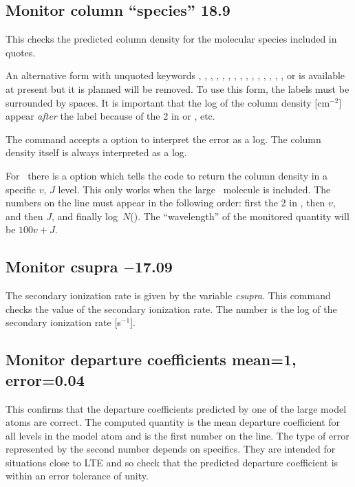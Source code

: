 \subsection{Monitor column ``species'' 18.9}

This checks the predicted column density for the molecular species
included in quotes.

An alternative form with unquoted keywords ,
, , , ,
, , , ,
, , , ,
, , or  is available at
present but it is planned will be removed.  To use this form, the
labels must be surrounded by spaces.  It is important that the log of
the column density [cm$^{-2}$] appear \emph{after} the label because
of the 2 in  or , etc.

The command accepts a  option to interpret
the error as a log.
The column density itself is always interpreted as a log.

For \htwo\ there is a  option which tells the code
to return the column density in a specific $v$, $J$ level.
This only works when the large \htwo\ molecule
is included.
The numbers on the line must appear in the following order:
first the 2 in , then $v$,
and then $J$, and finally log~$N$(\htwo).
The ``wavelength'' of the
monitored quantity will be $100v + J$.

\subsection{Monitor csupra $-$17.09}

The secondary ionization rate is given by the variable \emph{csupra}.
This command checks the value of the secondary ionization rate.
The number is the log of the secondary ionization rate [s$^{-1}$].

\subsection{Monitor departure coefficients  mean=1, error=0.04}

This confirms that the departure coefficients predicted by one of the
large model atoms are correct.
The computed quantity is the mean departure
coefficient for all levels in the model atom and is the first number on
the line.
The type of error represented by the second number depends on
specifics.
They are intended for situations close to LTE and so check that
the predicted departure coefficient is within an error tolerance of unity.

